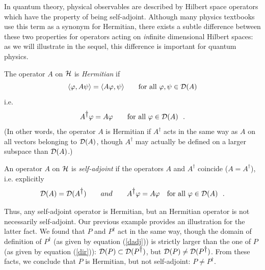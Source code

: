 \documentclass[a4wide,12pt]{report}
\begin{document}
In quantum theory,  
physical observables are described by Hilbert space operators 
which have the property of being self-adjoint.
Although many physics textbooks use 
this term as a synonym for Hermitian,
there exists a subtle difference between these two 
properties for operators acting on {\em in}finite dimensional 
Hilbert spaces: as we will illustrate in the sequel,
this difference 
is important for quantum physics.  
\begin{defin}
The operator $A$ on $\hs$ is {\em Hermitian} if 
\begin{equation}
\langle \varphi , A \psi \rangle  =
\langle A \varphi , \psi \rangle
\qquad \mbox{for all} \ \varphi, \psi \in {\cal D}(A)
\end{equation}
i.e.  
\[
A^{\dag} \varphi = A  \varphi
\qquad \mbox{for all} \ \varphi \in {\cal D}(A)
\ \ .
\]
(In other words, the operator $A$ is Hermitian if $A^{\dag}$
acts in the same way as $A$ on all vectors belonging to ${\cal D}(A)$,
though $A^{\dag}$ may actually be defined on a larger 
subspace  than ${\cal D}(A)$.) 
 
An operator $A$ on $\hs$ is
{\em self-adjoint} if the operators 
$A$ and $A^{\dag}$  coincide ($A= A^{\dag}$), i.e. 
explicitly  
\begin{equation}
{\cal D} (A) = {\cal D} (A^{\dag})
\qquad 
and \qquad 
A^{\dag} \varphi = A  \varphi
\quad \mbox{for all} \ \varphi \in {\cal D}(A)
\ \ .
\end{equation}
\end{defin}
Thus, any self-adjoint operator is Hermitian, but 
an Hermitian operator is not necessarily self-adjoint.
Our previous example provides an  
illustration for the latter fact. 
We found that $P$ and $P^{\dag}$ act in the same way, though 
the domain of definition 
of $P^{\dag}$ (as given by equation (\ref{dadj}))
is strictly larger than the one of $P$ 
(as given by equation (\ref{dir})):
${\cal D}(P) \subset {\cal D}(P^{\dag})$, but 
${\cal D}(P) \neq {\cal D}(P^{\dag})$.
From these facts, we conclude that $P$ is Hermitian, 
but not self-adjoint:
$P \neq P^{\dag}$. 
\end{document}
